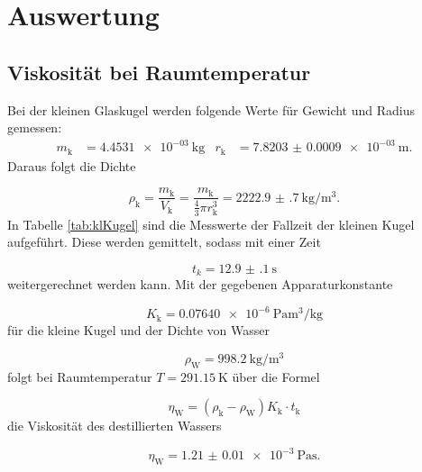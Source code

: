 \section{Auswertung}
\label{sec:Auswertung}

\subsection{Viskosität bei Raumtemperatur}

Bei der kleinen Glaskugel werden folgende Werte für Gewicht und Radius
gemessen:
\begin{align}
  m_\text{k} & = \SI{4.4531e-03}{\kilo\gram} & r_\text{k} & =
  \SI{7.8203(9)e-03}{\meter}.
\end{align}
Daraus folgt die Dichte

\begin{equation}
  \rho_\text{k} = \frac{m_\text{k}}{V_\text{k}} = \frac{m_\text{k}}
  {\frac{4}{3}\pi r_\text{k}^3} = \SI{2222.9(7)}{\kilo\gram\per\cubic\meter}.
\end{equation}
In Tabelle \ref{tab:klKugel} sind die Messwerte der Fallzeit der kleinen
Kugel aufgeführt. Diese werden gemittelt, sodass mit einer Zeit

\begin{equation}
  t_{k} = \SI{12.9(1)}{\second}
\end{equation}
weitergerechnet werden kann.
Mit der gegebenen Apparaturkonstante

\begin{equation}
  K_\text{k} = \SI{0.07640e-6}{\pascal\cubic\meter\per\kilo\gram}
\end{equation}
für die kleine Kugel und der Dichte von Wasser \cite{Wasserdichte}

\begin{equation}
  \rho_\text{W} = \SI{998.2}{\kilo\gram\per\cubic\meter}
\end{equation}
folgt bei Raumtemperatur $T=\SI{291.15}{\kelvin}$ über die Formel

\begin{equation}
  \eta_\text{W} = (\rho_\text{k}-\rho_\text{W})K_\text{k} \cdot t_\text{k}
  \label{eqn:Viskositaet}
\end{equation}
die Viskosität des destillierten Wassers

\begin{equation}
  \eta_\text{W} = \SI{1.21(1)e-3}{\pascal\second}.
  \label{eqn:Viskosi}
\end{equation}

